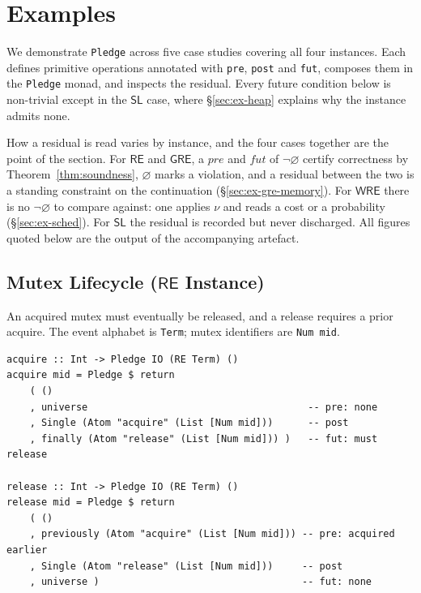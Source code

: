 \documentclass[acmsmall,screen]{acmart}
\newcommand{\RE}{\mathsf{RE}}
\newcommand{\GRE}{\mathsf{GRE}}
\newcommand{\WRE}{\mathsf{WRE}}
\newcommand{\SL}{\mathsf{SL}}
\newcommand{\pre}{\mathit{pre}}
\newcommand{\fut}{\mathit{fut}}
\newcommand{\univ}{\neg\varnothing}
\begin{document}
\section{Examples}
\label{sec:examples}

We demonstrate \lstinline{Pledge} across five case studies covering all four
instances.
Each defines primitive operations annotated with \lstinline{pre},
\lstinline{post} and \lstinline{fut}, composes them in the
\lstinline{Pledge} monad, and inspects the residual.
Every future condition below is non-trivial except in the $\SL$ case, where
\S\ref{sec:ex-heap} explains why the instance admits none.

How a residual is read varies by instance, and the four cases together are
the point of the section.
For $\RE$ and $\GRE$, a $\pre$ and $\fut$ of $\univ$ certify correctness by
Theorem~\ref{thm:soundness}, $\varnothing$ marks a violation, and a
residual between the two is a standing constraint on the continuation
(\S\ref{sec:ex-gre-memory}).
For $\WRE$ there is no $\univ$ to compare against: one applies $\nu$ and
reads a cost or a probability (\S\ref{sec:ex-sched}).
For $\SL$ the residual is recorded but never discharged.
All figures quoted below are the output of the accompanying artefact.

\subsection{Mutex Lifecycle (\texorpdfstring{$\RE$}{RE} Instance)}
\label{sec:ex-mutex}

An acquired mutex must eventually be released, and a release requires a
prior acquire.
The event alphabet is \lstinline{Term}; mutex identifiers are
\lstinline{Num mid}.

\begin{lstlisting}
acquire :: Int -> Pledge IO (RE Term) ()
acquire mid = Pledge $ return
    ( ()
    , universe                                      -- pre: none
    , Single (Atom "acquire" (List [Num mid]))      -- post
    , finally (Atom "release" (List [Num mid])) )   -- fut: must release

release :: Int -> Pledge IO (RE Term) ()
release mid = Pledge $ return
    ( ()
    , previously (Atom "acquire" (List [Num mid])) -- pre: acquired earlier
    , Single (Atom "release" (List [Num mid]))     -- post
    , universe )                                   -- fut: none
\end{lstlisting}
\end{document}
